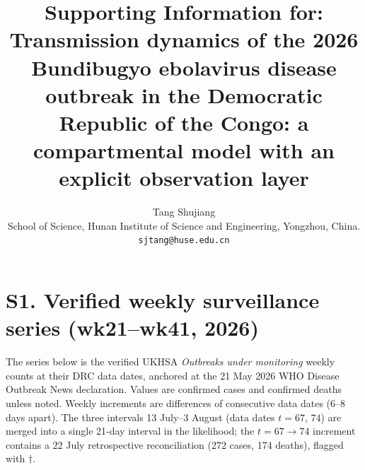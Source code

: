 \documentclass[11pt]{article}
\title{Supporting Information for: Transmission dynamics of the 2026
Bundibugyo ebolavirus disease outbreak in the Democratic Republic of the
Congo: a compartmental model with an explicit observation layer}
\author{Tang Shujiang\\
School of Science, Hunan Institute of Science and Engineering, Yongzhou,
China. \texttt{sjtang@huse.edu.cn}}
\date{}
\begin{document}
\maketitle

\section*{S1. Verified weekly surveillance series (wk21--wk41, 2026)}
\label{sec:si_weekly}

The series below is the verified UKHSA \emph{Outbreaks under monitoring}
weekly counts at their DRC data dates, anchored at the 21 May 2026 WHO
Disease Outbreak News declaration. Values are confirmed cases and confirmed
deaths unless noted. Weekly increments are differences of consecutive data
dates (6--8 days apart). The three intervals 13 July--3 August (data dates
$t=67$, $74$) are merged into a single 21-day interval in the likelihood; the
$t=67\to74$ increment contains a 22 July retrospective reconciliation
(272 cases, 174 deaths), flagged with $\dagger$.
\end{document}
